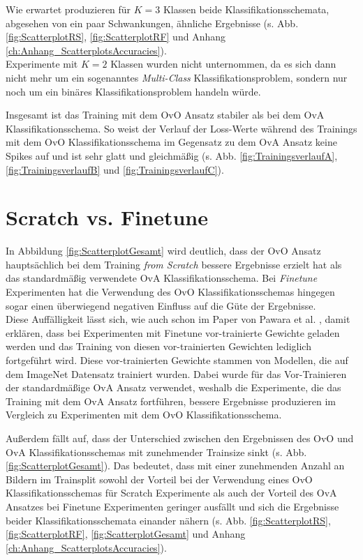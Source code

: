 Wie erwartet produzieren für $K=3$ Klassen beide Klassifikationsschemata, abgesehen von ein paar Schwankungen, ähnliche Ergebnisse (s. Abb. \ref{fig:ScatterplotRS}, \ref{fig:ScatterplotRF} und Anhang \ref{ch:Anhang_ScatterplotsAccuracies}). \\


Experimente mit $K=2$ Klassen wurden nicht unternommen, da es sich dann nicht mehr um ein sogenanntes \textit{Multi-Class} Klassifikationsproblem, sondern nur noch um ein binäres Klassifikationsproblem handeln würde.

Insgesamt ist das Training mit dem OvO Ansatz stabiler als bei dem OvA Klassifikationsschema. So weist der Verlauf der Loss-Werte während des Trainings mit dem OvO Klassifikationsschema im Gegensatz zu dem OvA Ansatz keine Spikes auf und ist sehr glatt und gleichmäßig (s. Abb. \ref{fig:TrainingsverlaufA}, \ref{fig:TrainingsverlaufB} und \ref{fig:TrainingsverlaufC}).

\section{Scratch vs. Finetune}
\label{ch:diskussionSvsF}
In Abbildung \ref{fig:ScatterplotGesamt} wird deutlich, dass der OvO Ansatz hauptsächlich bei dem Training \textit{from Scratch} bessere Ergebnisse erzielt hat als das standardmäßig verwendete OvA Klassifikationsschema. Bei \textit{Finetune} Experimenten hat die Verwendung des OvO Klassifikationsschemas hingegen sogar einen überwiegend negativen Einfluss auf die Güte der Ergebnisse.\\


Diese Auffälligkeit lässt sich, wie auch schon im Paper von Pawara et al. \cite{pawaraPaper}, damit erklären, dass bei Experimenten mit Finetune vor-trainierte Gewichte geladen werden und das Training von diesen vor-trainierten Gewichten lediglich fortgeführt wird. Diese vor-trainierten Gewichte stammen von Modellen, die auf dem ImageNet \cite{imagenet} Datensatz trainiert wurden. Dabei wurde für das Vor-Trainieren der standardmäßige OvA Ansatz verwendet, weshalb die Experimente, die das Training mit dem OvA Ansatz fortführen, bessere Ergebnisse produzieren im Vergleich zu Experimenten mit dem OvO Klassifikationsschema.


Außerdem fällt auf, dass der Unterschied zwischen den Ergebnissen des OvO und OvA Klassifikationsschemas mit zunehmender Trainsize sinkt (s. Abb. \ref{fig:ScatterplotGesamt}). Das bedeutet, dass mit einer zunehmenden Anzahl an Bildern im Trainsplit sowohl der Vorteil bei der Verwendung eines OvO Klassifikationsschemas für Scratch Experimente als auch der Vorteil des OvA Ansatzes bei Finetune Experimenten geringer ausfällt und sich die Ergebnisse beider Klassifikationsschemata einander nähern (s. Abb. \ref{fig:ScatterplotRS}, \ref{fig:ScatterplotRF}, \ref{fig:ScatterplotGesamt} und Anhang \ref{ch:Anhang_ScatterplotsAccuracies}).


